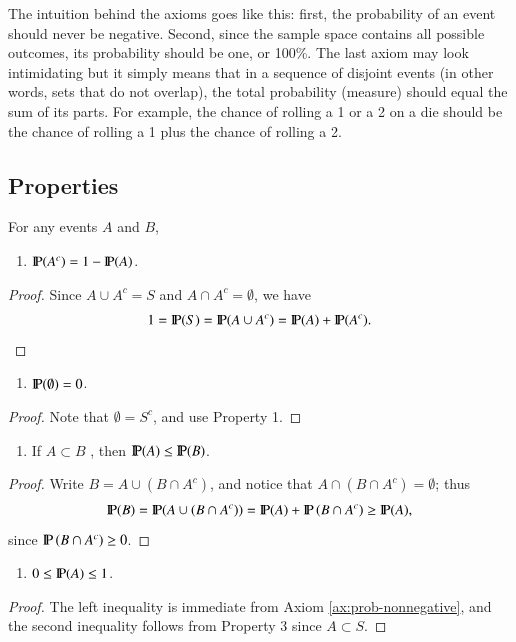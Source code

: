 \documentclass[captions=tableheading]{scrbook}
\begin{document}
The intuition behind the axioms goes like this: first, the probability of an event should never be negative. Second, since the sample space contains all possible outcomes, its probability should be one, or 100\%. The last axiom may look intimidating but it simply means that in a sequence of disjoint events (in other words, sets that do not overlap), the total probability (measure) should equal the sum of its parts. For example, the chance of rolling a 1 or a 2 on a die should be the chance of rolling a 1 plus the chance of rolling a 2.
\subsection{Properties}
\label{sec-4-4-2}


For any events \(A\) and \(B\),

\begin{enumerate}
\item \(\P(A^{c})=1-\P(A)\).\label{enu:prop-prob-complement}
\end{enumerate}
\begin{proof}
  Since \(A\cup A^{c}=S\) and \(A\cap A^{c}=\emptyset\), we have
  \[
  1=\P(S)=\P(A\cup A^{c})=\P(A)+\P(A^{c}).
  \]
\end{proof}
\begin{enumerate}
\item \(\P(\emptyset)=0\).
\end{enumerate}
\begin{proof}
  Note that \(\emptyset=S^{c}\), and use Property 1.
\end{proof}
\begin{enumerate}
\item If \(A\subset B\) , then \(\P(A)\leq\P(B)\).
\end{enumerate}
\begin{proof}
  Write \(B=A\cup\left(B\cap A^{c}\right)\), and notice that \(A\cap\left(B\cap A^{c}\right)=\emptyset\); thus
  \[
  \P(B)=\P(A\cup\left(B\cap A^{c}\right))=\P(A)+\P\left(B\cap A^{c}\right)\geq\P(A),
  \]
  since \(\P\left(B\cap A^{c}\right)\ge0\). 
\end{proof}
\begin{enumerate}
\item \(0\leq\P(A)\leq1\).
\end{enumerate}
\begin{proof}
  The left inequality is immediate from Axiom \ref{ax:prob-nonnegative}, and the second inequality follows from Property 3 since \(A\subset S\).
\end{proof}
\end{document}
